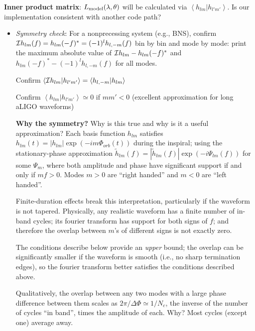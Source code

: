 \documentclass[twocolumn,prd,nofootinbib]{revtex4}
\newcommand\ForRichardOnly[1]{}
\newcommand\qmstateproduct[2]{\left\langle#1|#2\right\rangle}
\begin{document}
\begin{widetext}
\noindent \textbf{Inner product matrix}: $L_{\rm model}(\lambda,\theta)$ will be calculated via
$\qmstateproduct{h_{lm}}{h_{l'm'}}$.  Is our implementation consistent with another code path?
\begin{itemize}
\item \emph{Symmetry check}:  For a nonprecessing system (e.g., BNS), confirm ${\cal I}h_{lm}(f) =
  h_{lm}(-f)^*=(-1)^lh_{l,-m}(f)$ bin by bin and mode by mode: print the maximum absolute value of ${\cal I}h_{lm}  -
  h_{lm}(-f)^*$ and $h_{lm}(-f)^* -(-1)^l h_{l,-m}(f)$ for all modes.

Confirm  $\qmstateproduct{{\cal I} h_{lm}}{h_{l'm'}} = \qmstateproduct{h_{l,-m}}{h_{lm}}$

Confirm $\qmstateproduct{h_{lm}}{h_{l'm'}}\simeq 0$ if $m m' <0$  (excellent approximation for long aLIGO
waveforms)%
\begin{shaded}
\noindent \textbf{Why the symmetry?} Why is this true and why is it a useful approximation? Each basis function $h_{lm}$ satisfies $h_{lm}(t)=
|h_{lm}|\exp(-i m\Phi_{orb}(t))$ during the inspiral; using the stationary-phase approximation $\tilde{h}_{lm}(f) =
|\tilde{h}_{lm}(f)|\exp(-i \Psi_{lm}(f) )$ for some $\Psi_m$, where both amplitude and phase have significant support if
and only if $m f>0$.  Modes $m>0$ are ``right handed'' and $m<0$ are ``left handed''.  

Finite-duration effects break this interpretation, particularly if the waveform is not tapered.  Physically,  any realistic waveform has a finite number of in-band cycles; its
fourier transform has support for both signs of $f$; and therefore the overlap between $m$'s of different signs is not
exactly zero.  

The  conditions describe below provide an \emph{upper} bound; the overlap can be significantly smaller if the waveform is smooth (i.e., no
sharp termination edges), so the fourier transform better satisfies the conditions described above.

Qualitatively,  the overlap between any two modes with a large phase difference between them scales as $2\pi/\Delta \Phi
\simeq 1/N_c$, the inverse of the number of cycles ``in band'', times the amplitude of each.  Why? Most cycles (except one) average
away.   
\ForRichardOnly{
Approximating the overlap in the neighborhood of the local maximum, we find
\begin{eqnarray}
\qmstateproduct{h_{lm}}{h_{l'm'}} = 2\int df e^{-i\Delta\Psi(f)} \frac{|\tilde{h}_{lm}(f)\tilde{h}_{l'm'}(f)|}{S_h} \simeq
\frac{|\tilde{h}_{lm}(f_*)\tilde{h}_{l'm'}(f_*)|e^{i\Delta\Psi}}{S_h}\frac{1}{\sqrt{i \pi \frac{d^2\Delta \Psi}{df^2}}}
\end{eqnarray}
}


\end{shaded}
\end{itemize}
\end{widetext}
\end{document}
